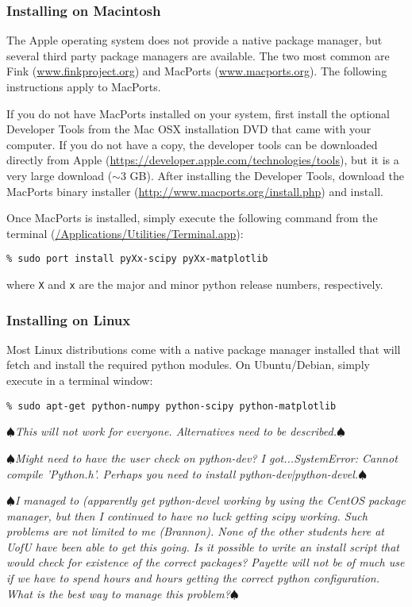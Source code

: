 \documentclass[11pt]{article}
\newcommand{\termcommand}[1]{\indent\hspace{.2in}\texttt{\% #1}\newline}
\newcommand{\AuthorMark}{$\spadesuit$}
\newcommand{\AuthorNote}[1]{{%
      \marginpar{$\longleftarrow$}
      \raggedright\footnotesize
      \itshape\smallskip\AuthorMark#1\AuthorMark\smallskip
}}%
\begin{document}
\subsubsection{Installing on Macintosh}
The Apple operating system does not provide a native package manager, but several
third party package managers are available.  The two most common are Fink
(\url{www.finkproject.org}) and MacPorts (\url{www.macports.org}).  The following
instructions apply to MacPorts.

If you do not have MacPorts installed on your system, first install the optional
Developer Tools from the Mac OSX installation DVD that came with your computer.
If you do not have a copy, the developer tools can be downloaded directly from
Apple (\url{https://developer.apple.com/technologies/tools}), but it is a very
large download ($\sim$3 GB).  After installing the Developer Tools, download the
MacPorts binary installer (\url{http://www.macports.org/install.php}) and
install.

Once MacPorts is installed, simply execute the following command from the
terminal (\url{/Applications/Utilities/Terminal.app}): \newline

\termcommand{sudo port install pyXx-scipy pyXx-matplotlib}

\noindent where \texttt{X} and \texttt{x} are the major and minor python release
numbers, respectively.

\subsubsection{Installing on Linux}
Most Linux distributions come with a native package manager installed that will
fetch and install the required python modules.  On Ubuntu/Debian, simply execute
in a terminal window:\newline

\termcommand{sudo apt-get python-numpy python-scipy python-matplotlib}
\AuthorNote{This will not work for everyone. Alternatives need to be described.}
\AuthorNote{Might need to have the user check on python-dev? I got...SystemError: Cannot compile 'Python.h'. Perhaps you need to install python-dev|python-devel.}
\AuthorNote{I managed to (apparently get python-devel working by using the CentOS package manager, but then I continued to have no luck getting scipy working. Such problems are not limited to me (Brannon).  None of the other students here at UofU have been able to get this going.  Is it possible to write an install script that would check for existence of the correct packages?  Payette will not be of much use if we have to spend hours and hours getting the correct python configuration. What is the best way to manage this problem?} 
\end{document}
